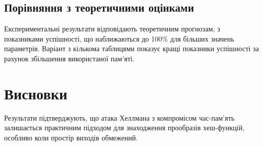 \documentclass[12pt]{article}
\begin{document}
\subsection{Порівняння з теоретичними оцінками}
Експериментальні результати відповідають теоретичним прогнозам, з показниками успішності, що наближаються до 100\% для більших значень параметрів. Варіант з кількома таблицями показує кращі показники успішності за рахунок збільшення використаної пам'яті.

\section{Висновки}
Результати підтверджують, що атака Хеллмана з компромісом час-пам'ять залишається практичним підходом для знаходження прообразів хеш-функцій, особливо коли простір виходів обмежений.
\end{document}
